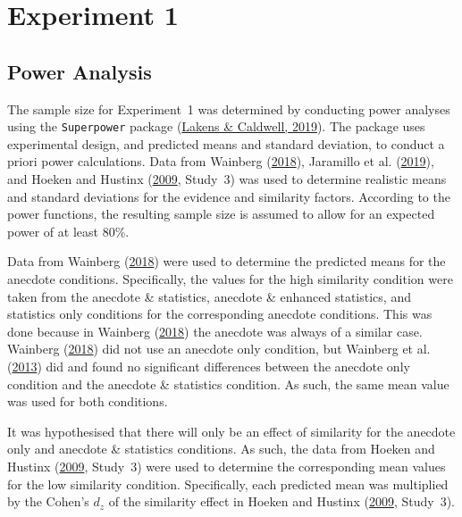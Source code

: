 \documentclass[
  man, donotrepeattitle,floatsintext]{apa7}
\theoremstyle{definition}
\theoremstyle{definition}
\theoremstyle{definition}
\theoremstyle{definition}
\theoremstyle{remark}
\begin{document}
\endgroup

\hypertarget{appendix-appendix}{%
\appendix}


\hypertarget{experiment-1}{%
\section{Experiment 1}\label{experiment-1}}

\hypertarget{power-analysis-1}{%
\subsection{Power Analysis}\label{power-analysis-1}}

The sample size for Experiment~1 was determined by conducting power analyses
using the \texttt{Superpower} package (\protect\hyperlink{ref-lakens2019}{Lakens \& Caldwell, 2019}). The package uses experimental
design, and predicted means and standard deviation, to conduct a priori power
calculations. Data from Wainberg (\protect\hyperlink{ref-wainberg2018}{2018}), Jaramillo et al. (\protect\hyperlink{ref-jaramillo2019}{2019}), and Hoeken and Hustinx (\protect\hyperlink{ref-hoeken2009}{2009}, Study~3)
was used to determine realistic means and standard deviations for the evidence
and similarity factors. According to the power functions, the resulting sample
size is assumed to allow for an expected power of at least 80\%.

Data from Wainberg (\protect\hyperlink{ref-wainberg2018}{2018}) were used to determine the predicted means for the
anecdote conditions. Specifically, the values for the high similarity condition
were taken from the anecdote \& statistics, anecdote \& enhanced statistics, and
statistics only conditions for the corresponding anecdote conditions. This was
done because in Wainberg (\protect\hyperlink{ref-wainberg2018}{2018}) the anecdote was always of a similar case.
Wainberg (\protect\hyperlink{ref-wainberg2018}{2018}) did not use an anecdote only condition, but Wainberg et al. (\protect\hyperlink{ref-wainberg2013}{2013}) did and
found no significant differences between the anecdote only condition and the
anecdote \& statistics condition. As such, the same mean value was used for both
conditions.

It was hypothesised that there will only be an effect of similarity for the
anecdote only and anecdote \& statistics conditions. As such, the data from
Hoeken and Hustinx (\protect\hyperlink{ref-hoeken2009}{2009}, Study~3) were used to determine the corresponding mean values for
the low similarity condition. Specifically, each predicted mean was multiplied
by the Cohen's \(d_z\) of the similarity effect in Hoeken and Hustinx (\protect\hyperlink{ref-hoeken2009}{2009}, Study~3).
\end{document}
